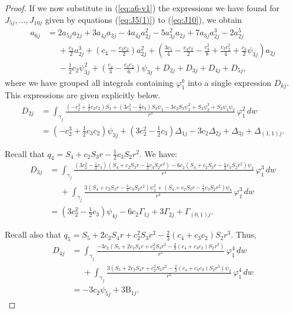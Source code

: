 \begin{proof}
If we now substitute in (\ref{eq:a6-v1}) the expressions we have found for $J_{5j},\ldots,J_{10j}$ given by equations (\ref{eq:J5(1)}) to (\ref{eq:J10}), we obtain
\begin{align*}
 a_{6j} &= 
2a_{5j}a_{2j}+3a_{4j}a_{3j}-4a_{4j}a_{2j}^2-5a_{3j}^2a_{2j}+7a_{3j}a_{2j}^3-2a_{2j}^5 \\
&\phantom{=}+\frac{c_3}{2}a_{2j}^3+\left(c_4-\frac{c_3c_2}{2}\right)a_{2j}^2+\left(\frac{3c_5}{4}-\frac{c_4c_2}{2}-\frac{c_3^2}{8}+\frac{c_3c_2^2}{4}+\frac{c_3}{2}\psi_{3j}\right)a_{2j} \\
&\phantom{=}-\frac{1}{2}c_2\psi_{3j}^2+\left(\frac{c_4}{3}-\frac{c_3c_2}{6}\right)\psi_{3j} +D_{2j}+D_{3j}+D_{4j}+D_{5j},
\end{align*}
where we have grouped all integrals containing $\varphi_1^k$ into a single expression $D_{kj}$. This expressions are given explicitly below.
\begin{align*}
 D_{2j} &= \int_{\gamma_j}\frac{(-c_2^3+\frac{1}{2}c_3c_2)S_3+(3c_2^2-\frac{1}{2}c_3)S_3\psi_2-3c_2S_3\psi_2^2+S_3\psi_2^3+S_3\psi_3\psi_2}{r^3}\,\varphi_1^2\,dw  \\
	&=  (-c_2^3+\frac{1}{2}c_3c_2)\psi_{3j} +(3c_2^2-\frac{1}{2}c_3)\Delta_{1j}-3c_2\Delta_{2j} +\Delta_{3j} +\Delta_{(1,1)j}.
\end{align*}

Recall that $q_4=S_4+c_2S_3r-\frac{1}{2}c_3S_2r^2$. We have:
\begin{align*}
 D_{3j} &= \int_{\gamma_j}\frac{(3c_2^2-\frac{1}{2}c_3)(S_4+c_2S_3r-\frac{1}{2}c_3S_2r^2)-6c_2(S_4+c_2S_3r-\frac{1}{2}c_3S_2r^2)\psi_2}{r^4}\,\varphi_1^3\,dw  \\
&\phantom{=} +\int_{\gamma_j}\frac{3(S_4+c_2S_3r-\frac{1}{2}c_3S_2r^2)\psi_2^2+(S_4+c_2S_3r-\frac{1}{2}c_3S_2r^2)\psi_3}{r^4}\,\varphi_1^3\,dw  \\
	&= (3c_2^2-\frac{1}{2}c_3)\psi_{4j}-6c_2\Gamma_{1j}+3\Gamma_{2j}+\Gamma_{(0,1)j}.
\end{align*}

Recall also that $q_5=S_5+2c_2S_4r+c_2^2S_3r^2-\frac{2}{3}(c_4+c_3c_2)S_2r^3$. Thus,
\begin{align*}
 D_{4j} &= \int_{\gamma_j}\frac{-3c_2\left(S_5+2c_2S_4r+c_2^2S_3r^2-\frac{2}{3}(c_4+c_3c_2)S_2r^3\right)}{r^5}\,\varphi_1^4\,dw \\
&\phantom{=} +\int_{\gamma_j}\frac{3\left(S_5+2c_2S_4r+c_2^2S_3r^2-\frac{2}{3}(c_4+c_3c_2)S_2r^3\right)\psi_2}{r^5}\,\varphi_1^4\,dw  \\
	&= -3c_2\psi_{5j}+3\mathrm{B}_{1j}.
\end{align*}


\end{proof}
